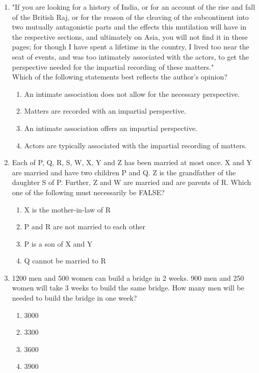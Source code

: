 \documentclass[journal]{IEEEtran}
\theoremstyle{remark}
\begin{document}
\begin{enumerate}
\item "If you are looking for a history of India, or for an account of the rise and fall of the British Raj, or for the reason of the cleaving of the subcontinent into two mutually antagonistic parts and the effects this mutilation will have in the respective sections, and ultimately on Asia, you will not find it in these pages; for though I have spent a lifetime in the country, I lived too near the seat of events, and was too intimately associated with the actors, to get the perspective needed for the impartial recording of these matters."\\ Which of the following statements best reflects the author's opinion? \hfill{}
\begin{enumerate}
    \item An intimate association does not allow for the necessary perspective.
    \item Matters are recorded with an impartial perspective.
    \item An intimate association offers an impartial perspective.
    \item Actors are typically associated with the impartial recording of matters.
\end{enumerate}

\item Each of P, Q, R, S, W, X, Y and Z has been married at most once. X and Y are married and have two children P and Q. Z is the grandfather of the daughter S of P. Further, Z and W are married and are parents of R. Which one of the following must necessarily be FALSE? \hfill{}
\begin{multicols}{2}
\begin{enumerate}
    \item X is the mother-in-law of R
    \item P and R are not married to each other
    \item P is a son of X and Y
    \item Q cannot be married to R
\end{enumerate}
\end{multicols}

\item 1200 men and 500 women can build a bridge in 2 weeks. 900 men and 250 women will take 3 weeks to build the same bridge. How many men will be needed to build the bridge in one week? \hfill{}
\begin{multicols}{4}
\begin{enumerate}
    \item $3000$
    \item $3300$
    \item $3600$
    \item $3900$
\end{enumerate}
\end{multicols}


\end{enumerate}
\end{document}
